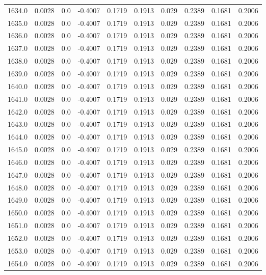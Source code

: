 \begin{longtable}{lrrrrrrrrr}
1634.0 & 0.0028 & 0.0 & -0.4007 & 0.1719 & 0.1913 & 0.029 & 0.2389 & 0.1681 & 0.2006 \\
1635.0 & 0.0028 & 0.0 & -0.4007 & 0.1719 & 0.1913 & 0.029 & 0.2389 & 0.1681 & 0.2006 \\
1636.0 & 0.0028 & 0.0 & -0.4007 & 0.1719 & 0.1913 & 0.029 & 0.2389 & 0.1681 & 0.2006 \\
1637.0 & 0.0028 & 0.0 & -0.4007 & 0.1719 & 0.1913 & 0.029 & 0.2389 & 0.1681 & 0.2006 \\
1638.0 & 0.0028 & 0.0 & -0.4007 & 0.1719 & 0.1913 & 0.029 & 0.2389 & 0.1681 & 0.2006 \\
1639.0 & 0.0028 & 0.0 & -0.4007 & 0.1719 & 0.1913 & 0.029 & 0.2389 & 0.1681 & 0.2006 \\
1640.0 & 0.0028 & 0.0 & -0.4007 & 0.1719 & 0.1913 & 0.029 & 0.2389 & 0.1681 & 0.2006 \\
1641.0 & 0.0028 & 0.0 & -0.4007 & 0.1719 & 0.1913 & 0.029 & 0.2389 & 0.1681 & 0.2006 \\
1642.0 & 0.0028 & 0.0 & -0.4007 & 0.1719 & 0.1913 & 0.029 & 0.2389 & 0.1681 & 0.2006 \\
1643.0 & 0.0028 & 0.0 & -0.4007 & 0.1719 & 0.1913 & 0.029 & 0.2389 & 0.1681 & 0.2006 \\
1644.0 & 0.0028 & 0.0 & -0.4007 & 0.1719 & 0.1913 & 0.029 & 0.2389 & 0.1681 & 0.2006 \\
1645.0 & 0.0028 & 0.0 & -0.4007 & 0.1719 & 0.1913 & 0.029 & 0.2389 & 0.1681 & 0.2006 \\
1646.0 & 0.0028 & 0.0 & -0.4007 & 0.1719 & 0.1913 & 0.029 & 0.2389 & 0.1681 & 0.2006 \\
1647.0 & 0.0028 & 0.0 & -0.4007 & 0.1719 & 0.1913 & 0.029 & 0.2389 & 0.1681 & 0.2006 \\
1648.0 & 0.0028 & 0.0 & -0.4007 & 0.1719 & 0.1913 & 0.029 & 0.2389 & 0.1681 & 0.2006 \\
1649.0 & 0.0028 & 0.0 & -0.4007 & 0.1719 & 0.1913 & 0.029 & 0.2389 & 0.1681 & 0.2006 \\
1650.0 & 0.0028 & 0.0 & -0.4007 & 0.1719 & 0.1913 & 0.029 & 0.2389 & 0.1681 & 0.2006 \\
1651.0 & 0.0028 & 0.0 & -0.4007 & 0.1719 & 0.1913 & 0.029 & 0.2389 & 0.1681 & 0.2006 \\
1652.0 & 0.0028 & 0.0 & -0.4007 & 0.1719 & 0.1913 & 0.029 & 0.2389 & 0.1681 & 0.2006 \\
1653.0 & 0.0028 & 0.0 & -0.4007 & 0.1719 & 0.1913 & 0.029 & 0.2389 & 0.1681 & 0.2006 \\
1654.0 & 0.0028 & 0.0 & -0.4007 & 0.1719 & 0.1913 & 0.029 & 0.2389 & 0.1681 & 0.2006 \\

\end{longtable}
